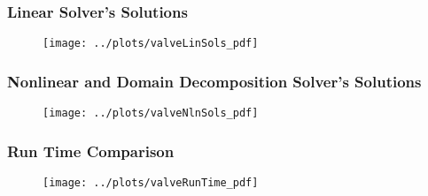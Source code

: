 \documentclass[compress,xcolor=table]{beamer}
\begin{document}
\begin{frame}
\frametitle{Linear Solver's Solutions}

\begin{figure}[h!t]
\centering
\texttt{[image: ../plots/valveLinSols\_pdf]}
\end{figure}

\end{frame}
\begin{frame}
\frametitle{Nonlinear and Domain Decomposition Solver's Solutions}

\begin{figure}[h!t]
\centering
\texttt{[image: ../plots/valveNlnSols\_pdf]}
\end{figure}

\end{frame}
\begin{frame}
\frametitle{Run Time Comparison}

\begin{figure}[h!t]
\centering
\texttt{[image: ../plots/valveRunTime\_pdf]}
\end{figure}

\end{frame}
\end{document}
